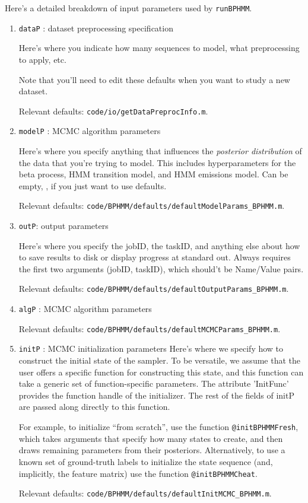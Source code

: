 \documentclass[fontsize=12]{article}
\begin{document}
Here's a detailed breakdown of input parameters used by \texttt{runBPHMM}.
\begin{enumerate}
\item \texttt{dataP} : dataset preprocessing specification

Here's where you indicate how many sequences to model, what preprocessing to apply, etc.

Note that you'll need to edit these defaults when you want to study a new dataset.

Relevant defaults: \texttt{code/io/getDataPreprocInfo.m}.

\item \texttt{modelP} : MCMC algorithm parameters

Here's where you specify anything that influences the \emph{posterior distribution} of the data that you're trying to model.  This includes hyperparameters for the beta process, HMM transition model, and HMM emissions model.  Can be empty, \texttt{{}}, if you just want to use defaults.

Relevant defaults: \texttt{code/BPHMM/defaults/defaultModelParams\_BPHMM.m}.

\item \texttt{outP}: output parameters

Here's where you specify the jobID, the taskID, and anything else about how to save results to disk or display progress at standard out. 
Always requires the first two arguments (jobID, taskID), which should't be Name/Value pairs.

Relevant defaults: \texttt{code/BPHMM/defaults/defaultOutputParams\_BPHMM.m}.

\item \texttt{algP} : MCMC algorithm parameters

Relevant defaults: \texttt{code/BPHMM/defaults/defaultMCMCParams\_BPHMM.m}.

\item \texttt{initP} : MCMC initialization parameters
Here's where we specify how to construct the initial state of the sampler.  To be versatile, we assume that the user offers a specific function for constructing this state, and this function can take a generic set of function-specific parameters.  The attribute 'InitFunc' provides the function handle of the initializer.  The rest of the fields of initP are passed along directly to this function.

For example, to initialize ``from scratch'', use the function \texttt{@initBPHMMFresh}, which takes arguments that specify how many states to create, and then draws remaining parameters from their posteriors.  Alternatively, to use a known set of ground-truth labels to initialize the state sequence (and, implicitly, the feature matrix) use the function \texttt{@initBPHMMCheat}.

Relevant defaults: \texttt{code/BPHMM/defaults/defaultInitMCMC\_BPHMM.m}.

\end{enumerate}
\end{document}
